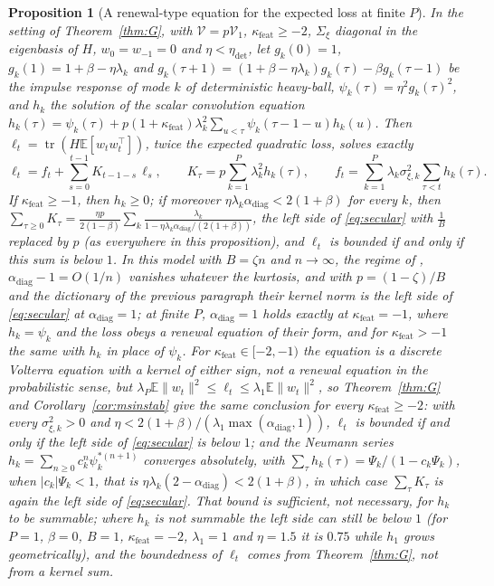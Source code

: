 \documentclass[11pt]{article}
\newtheorem{proposition}[theorem]{Proposition}
\theoremstyle{remark}
\newcommand{\E}{\mathbb{E}}
\newcommand{\tr}{\operatorname{tr}}
\begin{document}
\begin{proposition}[A renewal-type equation for the expected loss at finite $P$]\label{prop:renewal}
In the setting of Theorem~\ref{thm:G}, with $\mathcal V=p\mathcal V_1$, $\kappa_{\mathrm{feat}}\ge-2$, $\Sigma_\xi$ diagonal in the eigenbasis of $H$, $w_0=w_{-1}=0$ and $\eta<\eta_{\mathrm{det}}$, let $g_k(0)=1$, $g_k(1)=1+\beta-\eta\lambda_k$ and $g_k(\tau+1)=(1+\beta-\eta\lambda_k)g_k(\tau)-\beta g_k(\tau-1)$ be the impulse response of mode $k$ of deterministic heavy-ball, $\psi_k(\tau)=\eta^2g_k(\tau)^2$, and $h_k$ the solution of the scalar convolution equation $h_k(\tau)=\psi_k(\tau)+p(1+\kappa_{\mathrm{feat}})\lambda_k^2\sum_{u<\tau}\psi_k(\tau-1-u)h_k(u)$. Then $\ell_t=\tr(H\E[w_tw_t^\top])$, twice the expected quadratic loss, solves exactly
\[
\ell_t=f_t+\sum_{s=0}^{t-1}K_{t-1-s}\,\ell_s,\qquad K_\tau=p\sum_{k=1}^P\lambda_k^2h_k(\tau),\qquad f_t=\sum_{k=1}^P\lambda_k\sigma_{\xi,k}^2\sum_{\tau<t}h_k(\tau).
\]
If $\kappa_{\mathrm{feat}}\ge-1$, then $h_k\ge0$; if moreover $\eta\lambda_k\alpha_{\mathrm{diag}}<2(1+\beta)$ for every $k$, then $\sum_{\tau\ge0}K_\tau=\frac{\eta p}{2(1-\beta)}\sum_k\frac{\lambda_k}{1-\eta\lambda_k\alpha_{\mathrm{diag}}/(2(1+\beta))}$, the left side of \eqref{eq:secular} with $\frac1B$ replaced by $p$ (as everywhere in this proposition), and $\ell_t$ is bounded if and only if this sum is below $1$. In this model with $B=\zeta n$ and $n\to\infty$, the regime of \citet{lee2022minibatch}, $\alpha_{\mathrm{diag}}-1=O(1/n)$ vanishes whatever the kurtosis, and with $p=(1-\zeta)/B$ and the dictionary of the previous paragraph their kernel norm is the left side of \eqref{eq:secular} at $\alpha_{\mathrm{diag}}=1$; at finite $P$, $\alpha_{\mathrm{diag}}=1$ holds exactly at $\kappa_{\mathrm{feat}}=-1$, where $h_k=\psi_k$ and the loss obeys a renewal equation of their form, and for $\kappa_{\mathrm{feat}}>-1$ the same with $h_k$ in place of $\psi_k$. For $\kappa_{\mathrm{feat}}\in[-2,-1)$ the equation is a discrete Volterra equation with a kernel of either sign, not a renewal equation in the probabilistic sense, but $\lambda_P\E\|w_t\|^2\le\ell_t\le\lambda_1\E\|w_t\|^2$, so Theorem~\ref{thm:G} and Corollary~\ref{cor:msinstab} give the same conclusion for every $\kappa_{\mathrm{feat}}\ge-2$: with every $\sigma_{\xi,k}^2>0$ and $\eta<2(1+\beta)/(\lambda_1\max(\alpha_{\mathrm{diag}},1))$, $\ell_t$ is bounded if and only if the left side of \eqref{eq:secular} is below $1$; and the Neumann series $h_k=\sum_{n\ge0}c_k^n\psi_k^{*(n+1)}$ converges absolutely, with $\sum_\tau h_k(\tau)=\Psi_k/(1-c_k\Psi_k)$, when $|c_k|\Psi_k<1$, that is $\eta\lambda_k(2-\alpha_{\mathrm{diag}})<2(1+\beta)$, in which case $\sum_\tau K_\tau$ is again the left side of \eqref{eq:secular}. That bound is sufficient, not necessary, for $h_k$ to be summable; where $h_k$ is not summable the left side can still be below $1$ (for $P=1$, $\beta=0$, $B=1$, $\kappa_{\mathrm{feat}}=-2$, $\lambda_1=1$ and $\eta=1.5$ it is $0.75$ while $h_1$ grows geometrically), and the boundedness of $\ell_t$ comes from Theorem~\ref{thm:G}, not from a kernel sum.
\end{proposition}
\end{document}
